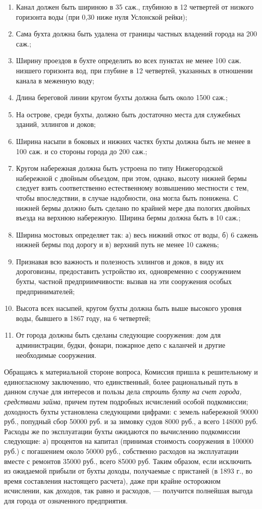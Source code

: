\documentclass[oneside,final,14pt]{extreport}
\begin{document}
	\begin{enumerate} 
		\item Канал должен быть шириною в 35 саж., глубиною в 12 четвертей от низкого горизонта воды (при 0,30 ниже нуля Услонской рейки);
		\item Сама бухта должна быть удалена от границы частных владений города на 200 саж.;
		\item Ширину проездов в бухте определить во всех пунктах не менее 100 саж. низшего горизонта вод, при глубине в 12 четвертей, указанных в отношении канала в меженную воду;
		\item Длина береговой линии кругом бухты должна быть около 1500 саж.;
		\item На острове, среди бухты, должно быть достаточно места для служебных зданий, эллингов и доков;
		\item Ширина насыпи в боковых и нижних частях бухты должна быть не менее в 100 саж. и со стороны города до 200 саж.;
		\item Кругом набережная должна быть устроена по типу Нижегородской набережной с двойным объездом, при этом, однако, высоту нижней бермы следует взять соответственно естественному возвышению местности с тем, чтобы впоследствии, в случае надобности, она могла быть понижена. С нижней бермы должно быть сделано по крайней мере два пологих двойных въезда на верхнюю набережную. Ширина бермы должна быть в 10 саж.;
		\item  Ширина мостовых определяет так: а) весь нижний откос от воды, б) 6 сажень нижней бермы под дорогу и в) верхний путь не менее 10 сажень;
		\item Признавая всю важность и полезность эллингов и доков, в виду их дороговизны, предоставить устройство их, одновременно с сооружением бухты, частной предприимчивости: вызвав на эти сооружения особых предпринимателей;
		\item Высота всех насыпей, кругом бухты должна быть выше высокого уровня воды, бывшего в 1867 году, на 6 четвертей;
		\item От города должны быть сделаны следующие сооружения: дом для администрации, будки, фонари, пожарное депо с каланчей и другие необходимые сооружения.
	\end{enumerate}
	
	Обращаясь к материальной стороне вопроса, Комиссия пришла к решительному и единогласному заключению, что единственный, более рациональный путь в данном случае для интересов и пользы дела {\it строить бухту на счет города, средствами займа}, причем путем подробных исчислений особой подкомиссии; доходность бухты установлена следующими цифрами: с земель набережной 90000 руб., попудный сбор 50000 руб. и за зимовку судов 8000 руб., а всего 148000 руб. Расходы же по эксплуатации бухты ожидаются по вычислению подкомиссии следующие: а) процентов на капитал (принимая стоимость сооружения в 100000 руб.) с погашением около 50000 руб., собственно расходов на эксплуатации вместе с ремонтов 35000 руб., всего 85000 руб. Таким образом, если исключить из ожидаемой прибыли от бухты доходы, получаемые с пристаней (в 1893 г., во время составления настоящего расчета), даже при крайне осторожном исчислении, как доходов, так равно и расходов, — получится полнейшая выгода для города от означенного предприятия.
	
\end{document}
